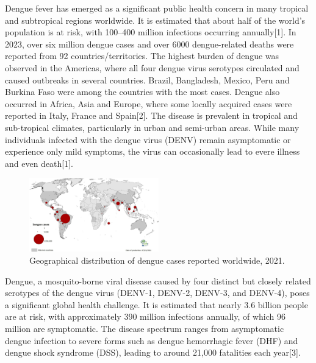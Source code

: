 \documentclass[conference]{IEEEtran}
\begin{document}
Dengue fever has emerged as a significant public health concern in many tropical and
subtropical regions worldwide. It is estimated that about half of the world’s population
is at risk, with 100–400 million infections occurring annually[1].
In 2023, over six million dengue cases and over 6000 dengue-related deaths were reported
from 92 countries/territories. The highest burden of dengue was observed in the Americas,
where all four dengue virus serotypes circulated and caused outbreaks in several countries.
Brazil, Bangladesh, Mexico, Peru and Burkina Faso were among the countries with
the most cases. Dengue also occurred in Africa, Asia and Europe, where some
locally acquired cases were reported in Italy, France and Spain[2].
The disease is prevalent in tropical and sub-tropical climates, particularly in urban and
semi-urban areas. While many individuals infected with the dengue virus (DENV) remain
asymptomatic or experience only mild symptoms, the virus can occasionally lead to
evere illness and even death[1].

\begin{figure}[htbp]
    \centering
    \includegraphics[width=0.5\textwidth]{fig1.png}
    \caption{Geographical distribution of dengue cases reported worldwide, 2021.}
\end{figure}

Dengue, a mosquito-borne viral disease caused by four distinct but closely
related serotypes of the dengue virus (DENV-1, DENV-2, DENV-3, and DENV-4), poses a
significant global health challenge. It is estimated that nearly 3.6 billion people
are at risk, with approximately 390 million infections annually, of which 96 million are
symptomatic. The disease spectrum ranges from asymptomatic dengue infection to severe
forms such as dengue hemorrhagic fever (DHF) and dengue shock syndrome (DSS), leading to
around 21,000 fatalities each year[3]. \\
\end{document}

